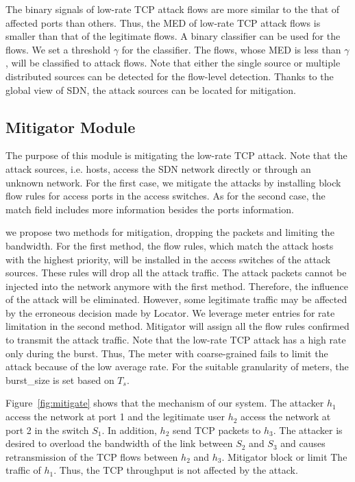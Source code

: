 The binary signals of low-rate TCP attack flows are more similar to the that of affected ports than others. Thus, the MED of low-rate TCP attack flows is smaller than that of the legitimate flows. A binary classifier can be used for the flows. We set a threshold $\gamma$ for the classifier. The flows, whose MED is less than $\gamma$, will be classified to attack flows. Note that either the single source or multiple distributed sources can be detected for the flow-level detection. Thanks to the global view of SDN, the attack sources can be located for mitigation.

\subsection{Mitigator Module}

The purpose of this module is mitigating the low-rate TCP attack. Note that the attack sources, i.e. hosts, access the SDN network directly or through an unknown network. For the first case, we mitigate the attacks by installing block flow rules for access ports in the access switches. As for the second case, the match field includes more information besides the ports information. 

we propose two methods for mitigation, dropping the packets and limiting the bandwidth. For the first method, the flow rules, which match the attack hosts with the highest priority, will be installed in the access switches of the attack sources. These rules will drop all the attack traffic. The attack packets cannot be injected into the network anymore with the first method. Therefore, the influence of the attack will be eliminated. However, some legitimate traffic may be affected by the erroneous decision made by Locator. We leverage meter entries for rate limitation in the second method. Mitigator will assign all the flow rules confirmed to transmit the attack traffic. Note that the low-rate TCP attack has a high rate only during the burst. Thus, The meter with coarse-grained fails to limit the attack because of the low average rate. For the suitable granularity of meters, the burst\_size is set based on $T_s$.

Figure~\ref{fig:mitigate} shows that the mechanism of our system. The attacker $h_1$ access the network at port 1 and the legitimate user $h_2$ access the network at port 2 in the switch $S_1$. In addition, $h_2$ send TCP packets to $h_3$. The attacker is desired to overload the bandwidth of the link between $S_2$ and $S_3$ and causes retransmission of the TCP flows between $h_2$ and $h_3$. Mitigator block or limit The traffic of $h_1$. Thus, the TCP throughput is not affected by the attack.

